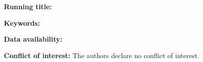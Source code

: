 \documentclass[12pt]{article}
\begin{document}
\maketitle

\noindent\textbf{Running title:}

\noindent\textbf{Keywords:}

\noindent\textbf{Data availability:}

\noindent\textbf{Conflict of interest:} The authors declare no conflict of interest.
\end{document}
